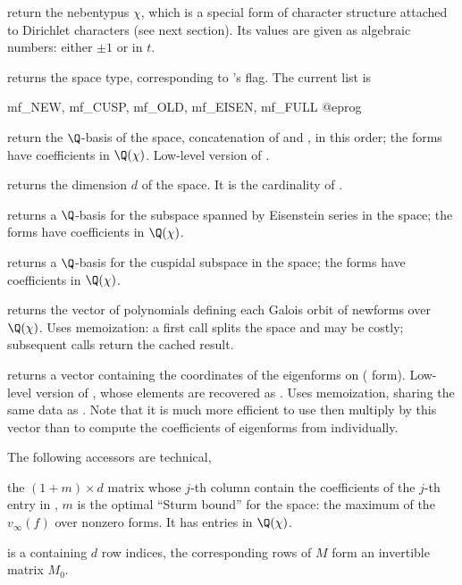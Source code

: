  return the nebentypus $\chi$, which is a
 special form of character structure attached to Dirichlet characters (see
 next section). Its values are given as algebraic numbers: either $\pm1$ or
  in $t$.

 returns the space type, corresponding
to 's  flag. The current list is

\bprog
mf_NEW, mf_CUSP, mf_OLD, mf_EISEN, mf_FULL
@eprog

 return the $\Q$-basis of the space,
concatenation of  and , in this order; the forms
have coefficients in $\Q(\chi)$. Low-level version of .

 returns the dimension $d$ of the space. It
is the cardinality of .

 returns a $\Q$-basis for the subspace
spanned by Eisenstein series in the space; the forms have coefficients in
$\Q(\chi)$.

 returns a $\Q$-basis for the cuspidal subspace
in the space; the forms have coefficients in $\Q(\chi)$.

 returns the vector of polynomials defining
each Galois orbit of newforms over $\Q(\chi)$. Uses memoization: a first call
splits the space and may be costly; subsequent calls return the cached
result.

 returns a vector  containing the
coordinates of the eigenforms on  ( form).
Low-level version of
, whose elements are recovered as . Uses memoization, sharing the same data as
. Note that it is much more efficient to use
 then multiply by this vector than to compute the
coefficients of eigenforms from  individually.

The following accessors are technical,

 the $(1+m) \times d$ matrix whose $j$-th column
contain the coefficients of the $j$-th entry in , $m$
is the optimal ``Sturm bound'' for the space: the maximum of the $v_\infty(f)$
over nonzero forms. It has entries in $\Q(\chi)$.

 is a  containing $d$ row
indices, the corresponding rows of $M$ form an invertible matrix $M_0$.

